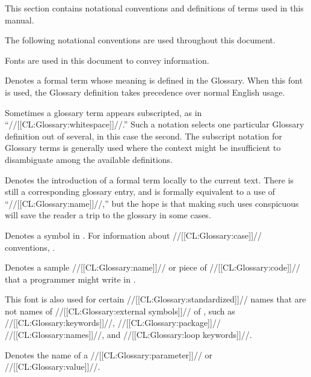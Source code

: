 

This section contains notational conventions and definitions of terms used in this manual.


The following notational conventions are used throughout this document.


Fonts are used in this document to convey information.

\beginlist


Denotes a formal term whose meaning is defined in the Glossary. When this font is used, the Glossary definition takes precedence  over normal English usage.

Sometimes a glossary term appears subscripted,  as in ``//[[CL:Glossary:whitespace]]//.''   Such a notation selects one particular Glossary definition out of several, in this case the second. The subscript notation for Glossary terms is generally used where the context might be insufficient to disambiguate among the available definitions.


Denotes the introduction of a formal term locally to the current text. There is still a corresponding glossary entry, and is formally equivalent to a use of ``//[[CL:Glossary:name]]//,'' but the hope is that making such uses  conspicuous will save the reader a trip to the glossary in some cases.

                            Denotes a symbol in . For information about //[[CL:Glossary:case]]// conventions, \seesection\CaseInSymbols.


Denotes a sample //[[CL:Glossary:name]]// or piece of //[[CL:Glossary:code]]// that a programmer might write in \clisp.

This font is also used for certain //[[CL:Glossary:standardized]]// names that are not names of //[[CL:Glossary:external symbols]]// of ,  such as //[[CL:Glossary:keywords]]//,
        //[[CL:Glossary:package]]// //[[CL:Glossary:names]]//,
    and //[[CL:Glossary:loop keywords]]//.


Denotes the name of a //[[CL:Glossary:parameter]]// or //[[CL:Glossary:value]]//.

